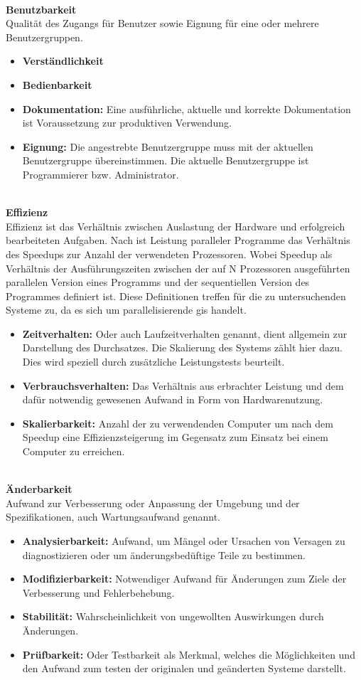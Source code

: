 \ \\
%
\textbf{Benutzbarkeit}\\
Qualität des Zugangs für Benutzer sowie Eignung für eine oder mehrere Benutzergruppen.
\begin{itemize}
\item \textbf{Verständlichkeit} 
\item \textbf{Bedienbarkeit}
\item \textbf{Dokumentation:} Eine ausführliche, aktuelle und korrekte Dokumentation ist Voraussetzung zur produktiven Verwendung.
\item \textbf{Eignung:} Die angestrebte Benutzergruppe muss mit der aktuellen Benutzergruppe übereinstimmen. Die aktuelle Benutzergruppe ist Programmierer bzw. Administrator.
\end{itemize}
\ \\
%
\textbf{Effizienz}\\
Effizienz ist das Verhältnis zwischen Auslastung der Hardware und erfolgreich bearbeiteten Aufgaben. Nach \cite[S.21]{book:Leistungsanalyse} ist Leistung paralleler Programme das Verhältnis des Speedups zur Anzahl der verwendeten Prozessoren. Wobei Speedup als Verhältnis der Ausführungszeiten zwischen der auf N Prozessoren ausgeführten parallelen Version eines Programms und der sequentiellen Version des Programmes definiert ist. Diese Definitionen treffen für die zu untersuchenden Systeme zu, da es sich um parallelisierende \Gls{gis} handelt.
\begin{itemize}
\item \textbf{Zeitverhalten:} Oder auch Laufzeitverhalten genannt, dient allgemein zur Darstellung des Durchsatzes. Die Skalierung des Systems zählt hier dazu. Dies wird speziell durch zusätzliche Leistungstests beurteilt.
\item \textbf{Verbrauchsverhalten:} Das Verhältnis aus erbrachter Leistung und dem dafür notwendig gewesenen Aufwand in Form von Hardwarenutzung.
\item \textbf{Skalierbarkeit:} Anzahl der zu verwendenden Computer um nach dem Speedup eine Effizienzsteigerung im Gegensatz zum Einsatz bei einem Computer zu erreichen.
\end{itemize}
\ \\
%
\textbf{Änderbarkeit}\\
Aufwand zur Verbesserung oder Anpassung der Umgebung und der Spezifikationen, auch Wartungsaufwand genannt.
\begin{itemize}
\item \textbf{Analysierbarkeit:} \glqq Aufwand, um Mängel oder Ursachen von Versagen zu diagnostizieren oder um änderungsbedüftige Teile zu bestimmen.\grqq\ \cite[S. 260]{book:lehrbuchsoftware}
\item \textbf{Modifizierbarkeit:} Notwendiger Aufwand für Änderungen zum Ziele der Verbesserung und Fehlerbehebung.
\item \textbf{Stabilität:} Wahrscheinlichkeit von ungewollten Auswirkungen durch Änderungen.
\item \textbf{Prüfbarkeit:} Oder Testbarkeit als Merkmal, welches die Möglichkeiten und den Aufwand zum testen der originalen und geänderten Systeme darstellt.
\end{itemize}
